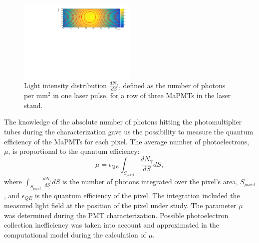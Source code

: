 \begin{figure}[h]
\centering
\includegraphics[width=0.5\textwidth]{figures/photon_flux.pdf}
\caption{Light intensity distribution $\frac {dN_\gamma}{dS}$, defined as the number of photons per mm$^{2}$ in one laser pulse, for a row of three MaPMTs in the laser stand.}
\label{fig:light_flux}
\end{figure}

The knowledge of the absolute number of photons hitting the photomultiplier tubes during the characterization gave us the possibility to measure the quantum efficiency of the MaPMTs for each pixel. The average number of photoelectrons, $\mu$, is proportional to the quantum efficiency:
$$
\mu=\epsilon_{QE} \int_{S_{pixel}}\frac {dN_\gamma}{dS} dS,
$$
\noindent
where $\int_{S_{pixel}}\frac {dN_\gamma}{dS} dS$ is the number of photons integrated over the pixel's area, $S_{pixel}$, and $\epsilon_{QE}$ is the quantum efficiency of the pixel.
The integration included the measured light field at the position of the pixel under study.
The parameter $\mu$ was determined during the PMT characterization. Possible photoelectron collection inefficiency was taken into account and approximated in the computational model during the calculation of $\mu$.